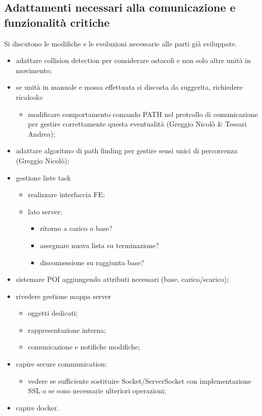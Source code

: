 \subsection{Adattamenti necessari alla comunicazione e funzionalità critiche}
    Si discutono le modifiche e le evoluzioni necessarie alle parti già sviluppate.
    \begin{itemize}
        \item adattare collision detection per considerare ostacoli e non solo altre unità in movimento;
        \item se unità in manuale e mossa effettuata si discosta da suggerita, richiedere ricalcolo:
        \begin{itemize}
            \item modificare comportamento comando PATH nel protcollo di comunicazione per gestire correttamente questa eventualità (Greggio Nicolò \& Tessari Andrea);
        \end{itemize}
        \item adattare algoritmo di path finding per gestire sensi unici di percorrenza (Greggio Nicolò);
        \item gestione liste task
        \begin{itemize}
            \item realizzare interfaccia FE;
            \item lato server:
            \begin{itemize}
                \item ritorno a carico o base?
                \item assegnare nuova lista su terminazione?
                \item disconnessione su raggiunta base?
            \end{itemize}
        \end{itemize}
        \item sistemare POI aggiungendo attributi necessari (base, carico/scarico);
        \item rivedere gestione mappa server
        \begin{itemize}
            \item oggetti dedicati;
            \item rappresentazione interna;
            \item comunicazione e notifiche modifiche;
        \end{itemize}
        \item capire secure communication:
        \begin{itemize}
            \item vedere se sufficiente sostituire Socket/ServerSocket con implementazione SSL o se sono necessarie ulteriori operazioni;
        \end{itemize}
        \item capire docker.
    \end{itemize}













